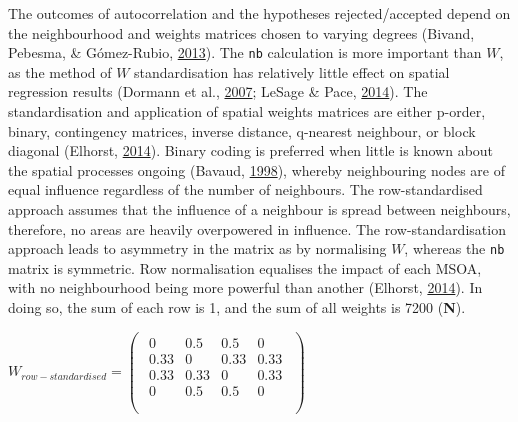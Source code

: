 \documentclass[12pt,twoside]{reedthesis}
\begin{document}
The outcomes of autocorrelation and the hypotheses rejected/accepted depend on the neighbourhood and weights matrices chosen to varying degrees (Bivand, Pebesma, \& Gómez-Rubio, \protect\hyperlink{ref-bivand2013}{2013}). The \texttt{nb} calculation is more important than \(W\), as the method of \(W\) standardisation has relatively little effect on spatial regression results (Dormann et al., \protect\hyperlink{ref-dormann2007}{2007}; LeSage \& Pace, \protect\hyperlink{ref-lesage2014}{2014}). The standardisation and application of spatial weights matrices are either p-order, binary, contingency matrices, inverse distance, q-nearest neighbour, or block diagonal (Elhorst, \protect\hyperlink{ref-elhorst2014}{2014}). Binary coding is preferred when little is known about the spatial processes ongoing (Bavaud, \protect\hyperlink{ref-bavaud1998}{1998}), whereby neighbouring nodes are of equal influence regardless of the number of neighbours. The row-standardised approach assumes that the influence of a neighbour is spread between neighbours, therefore, no areas are heavily overpowered in influence. The row-standardisation approach leads to asymmetry in the matrix as by normalising \(W\), whereas the \texttt{nb} matrix is symmetric. Row normalisation equalises the impact of each MSOA, with no neighbourhood being more powerful than another (Elhorst, \protect\hyperlink{ref-elhorst2014}{2014}). In doing so, the sum of each row is 1, and the sum of all weights is 7200 (\textbf{N}).
~

\(W_{row-standardised}=\left(\begin{matrix}\begin{matrix}0&0.5&0.5&0\\0.33&0&0.33&0.33\\0.33&0.33&0&0.33\\0&0.5&0.5&0\\\end{matrix}\\\end{matrix}\right)\ \)
~
\end{document}
